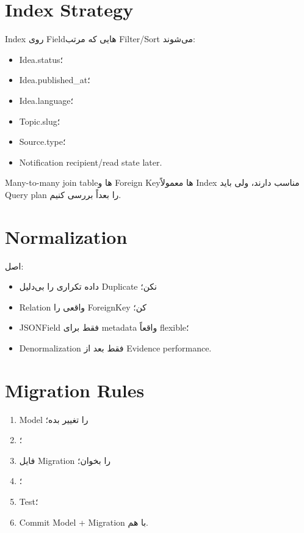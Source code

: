 \section{Index Strategy}

Index روی Fieldهایی که مرتب Filter/Sort می‌شوند:
\begin{itemize}
  \item Idea.status؛
  \item Idea.published\_at؛
  \item Idea.language؛
  \item Topic.slug؛
  \item Source.type؛
  \item Notification recipient/read state later.
\end{itemize}

Many-to-many join tableها و Foreign Keyها معمولاً Index مناسب دارند، ولی باید Query plan را بعداً بررسی کنیم.

\section{Normalization}

اصل:
\begin{itemize}
  \item داده تکراری را بی‌دلیل Duplicate نکن؛
  \item Relation واقعی را ForeignKey کن؛
  \item JSONField فقط برای metadata واقعاً flexible؛
  \item Denormalization فقط بعد از Evidence performance.
\end{itemize}

\section{Migration Rules}

\begin{enumerate}
  \item Model را تغییر بده؛
  \item {}؛
  \item فایل Migration را بخوان؛
  \item {}؛
  \item Test؛
  \item Commit Model + Migration با هم.
\end{enumerate}
